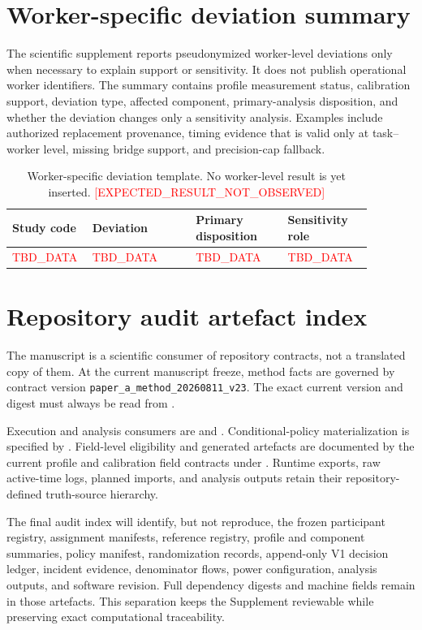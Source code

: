 \documentclass[preprint,12pt]{elsarticle}
\newcommand{\expectedresult}{\textcolor{red}{[EXPECTED\_RESULT\_NOT\_OBSERVED]}}
\newcommand{\tbddata}{\textcolor{red}{TBD\_DATA}}
\begin{document}
\section{Worker-specific deviation summary}
\label{sup:deviations}

The scientific supplement reports pseudonymized worker-level deviations only when necessary to explain support or sensitivity. It does not publish operational worker identifiers. The summary contains profile measurement status, calibration support, deviation type, affected component, primary-analysis disposition, and whether the deviation changes only a sensitivity analysis. Examples include authorized replacement provenance, timing evidence that is valid only at task--worker level, missing bridge support, and precision-cap fallback.

\begin{table}[h]
\centering
\caption{Worker-specific deviation template. No worker-level result is yet inserted. \expectedresult{}}
\label{tab:supdeviation}
\begin{tabular}{p{0.15\linewidth}p{0.27\linewidth}p{0.24\linewidth}p{0.22\linewidth}}
\toprule
Study code & Deviation & Primary disposition & Sensitivity role \\
\midrule
\tbddata{} & \tbddata{} & \tbddata{} & \tbddata{} \\
\bottomrule
\end{tabular}
\end{table}

\section{Repository audit artefact index}
\label{sup:audit}

The manuscript is a scientific consumer of repository contracts, not a translated copy of them. At the current manuscript freeze, method facts are governed by contract version \texttt{paper\_a\_method\_20260811\_v23}. The exact current version and digest must always be read from
.

Execution and analysis consumers are
 and
. Conditional-policy materialization is specified by
. Field-level eligibility and generated artefacts are documented by the current profile and calibration field contracts under . Runtime exports, raw active-time logs, planned imports, and analysis outputs retain their repository-defined truth-source hierarchy.

The final audit index will identify, but not reproduce, the frozen participant registry, assignment manifests, reference registry, profile and component summaries, policy manifest, randomization records, append-only V1 decision ledger, incident evidence, denominator flows, power configuration, analysis outputs, and software revision. Full dependency digests and machine fields remain in those artefacts. This separation keeps the Supplement reviewable while preserving exact computational traceability.
\end{document}
